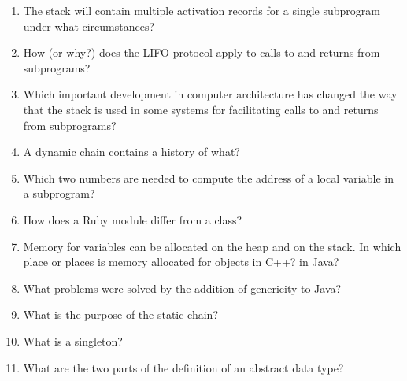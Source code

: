 \begin{enumerate}
  \item The stack will contain multiple activation
    records for a single subprogram under what
    circumstances?

  \item How (or why?) does the LIFO protocol apply to
    calls to and returns from subprograms?

  \item Which important development in computer architecture
    has changed the way that the stack is used in some
    systems for facilitating calls to and returns from
    subprograms?

  \item A dynamic chain contains a history of what?

  \item Which two numbers are needed to compute
    the address of a local variable in a subprogram?

  \item How does a Ruby module differ from a class?

  \item Memory for variables can be allocated on the heap
    and on the stack. In which place or places is memory
    allocated for objects in C++? in Java?

  \item What problems were solved by the addition
    of genericity to Java?

  \item What is the purpose of the static chain?

  \item What is a singleton?

  \item What are the two parts of the definition 
    of an abstract data type?

  \end{enumerate}


